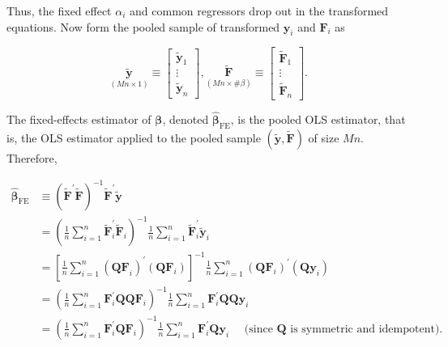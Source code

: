 \documentclass[10pt]{article}
\begin{document}
Thus, the fixed effect $\alpha_{i}$ and common regressors drop out in the transformed equations. Now form the pooled sample of transformed $\mathbf{y}_{i}$ and $\mathbf{F}_{i}$ as

\[
\underset{(M n \times 1)}{\tilde{\mathbf{y}}} \equiv\left[\begin{array}{c}
\tilde{\mathbf{y}}_{1}  \tag{5.2.3}\\
\vdots \\
\tilde{\mathbf{y}}_{n}
\end{array}\right], \underset{(M n \times \# \beta)}{\widetilde{\mathbf{F}}} \equiv\left[\begin{array}{c}
\widetilde{\mathbf{F}}_{1} \\
\vdots \\
\tilde{\mathbf{F}}_{n}
\end{array}\right] \text {. }
\]

The fixed-effects estimator of $\boldsymbol{\beta}$, denoted $\widehat{\boldsymbol{\beta}}_{\mathrm{FE}}$, is the pooled OLS estimator, that is, the OLS estimator applied to the pooled sample $(\tilde{\mathbf{y}}, \tilde{\mathbf{F}})$ of size $M n$. Therefore,


\begin{align*}
\widehat{\boldsymbol{\beta}}_{\mathrm{FE}} & \equiv\left(\widetilde{\mathbf{F}}^{\prime} \widetilde{\mathbf{F}}\right)^{-1} \widetilde{\mathbf{F}}^{\prime} \tilde{\mathbf{y}} \\
& =\left(\frac{1}{n} \sum_{i=1}^{n} \widetilde{\mathbf{F}}_{i}^{\prime} \widetilde{\mathbf{F}}_{i}\right)^{-1} \frac{1}{n} \sum_{i=1}^{n} \widetilde{\mathbf{F}}_{i}^{\prime} \tilde{\mathbf{y}}_{i} \\
& =\left[\frac{1}{n} \sum_{i=1}^{n}\left(\mathbf{Q F}_{i}\right)^{\prime}\left(\mathbf{Q} \mathbf{F}_{i}\right)\right]^{-1} \frac{1}{n} \sum_{i=1}^{n}\left(\mathbf{Q} \mathbf{F}_{i}\right)^{\prime}\left(\mathbf{Q} \mathbf{y}_{i}\right) \\
& =\left(\frac{1}{n} \sum_{i=1}^{n} \mathbf{F}_{i}^{\prime} \mathbf{Q} \mathbf{Q} \mathbf{F}_{i}\right)^{-1} \frac{1}{n} \sum_{i=1}^{n} \mathbf{F}_{i}^{\prime} \mathbf{Q Q} \mathbf{y}_{i} \\
& =\left(\frac{1}{n} \sum_{i=1}^{n} \mathbf{F}_{i}^{\prime} \mathbf{Q} \mathbf{F}_{i}\right)^{-1} \frac{1}{n} \sum_{i=1}^{n} \mathbf{F}_{i}^{\prime} \mathbf{Q} \mathbf{y}_{i} \quad \text { (since } \mathbf{Q} \text { is symmetric and idempotent). } \tag{5.2.4}
\end{align*}
\end{document}
